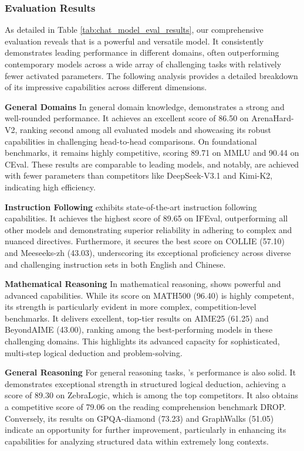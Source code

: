 \subsubsection{Evaluation Results}

As detailed in Table \ref{tab:chat_model_eval_results}, our comprehensive evaluation reveals that \longcat is a powerful and versatile model. It consistently demonstrates leading performance in different domains, often outperforming contemporary models across a wide array of challenging tasks with relatively fewer activated parameters. The following analysis provides a detailed breakdown of its impressive capabilities across different dimensions.

\textbf{General Domains}  In general domain knowledge, \longcat demonstrates a strong and well-rounded performance. It achieves an excellent score of 86.50 on ArenaHard-V2, ranking second among all evaluated models and showcasing its robust capabilities in challenging head-to-head comparisons. On foundational benchmarks, it remains highly competitive, scoring 89.71 on MMLU and 90.44 on CEval. These results are comparable to leading models, and notably, are achieved with fewer parameters than competitors like DeepSeek-V3.1 and Kimi-K2, indicating high efficiency.

\textbf{Instruction Following}  \longcat exhibits state-of-the-art instruction following capabilities. It achieves the highest score of 89.65 on IFEval, outperforming all other models and demonstrating superior reliability in adhering to complex and nuanced directives. Furthermore, it secures the best score on COLLIE (57.10) and Meeseeks-zh (43.03), underscoring its exceptional proficiency across diverse and challenging instruction sets in both English and Chinese.

\textbf{Mathematical Reasoning}  In mathematical reasoning, \longcat shows powerful and advanced capabilities. While its score on MATH500 (96.40) is highly competent, its strength is particularly evident in more complex, competition-level benchmarks. It delivers excellent, top-tier results on AIME25 (61.25) and BeyondAIME (43.00), ranking among the best-performing models in these challenging domains. This highlights its advanced capacity for sophisticated, multi-step logical deduction and problem-solving.

\textbf{General Reasoning}  For general reasoning tasks, \longcat's performance is also solid. It demonstrates exceptional strength in structured logical deduction, achieving a score of 89.30 on ZebraLogic, which is among the top competitors. It also obtains a competitive score of 79.06 on the reading comprehension benchmark DROP. Conversely, its results on GPQA-diamond (73.23) and GraphWalks (51.05) indicate an opportunity for further improvement, particularly in enhancing its capabilities for analyzing structured data within extremely long contexts.

